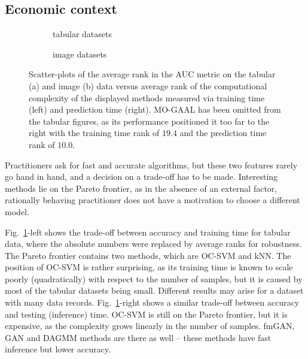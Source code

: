 \subsection{Economic context}
\label{sec:economic_context}
\begin{figure*}
    \centering
    \begin{subfigure}{\columnwidth}
        \centering
        \small
        \resizebox {0.66\linewidth}{!}{
            
        }
        \caption{tabular datasets}
        \label{fig:tabular_total_eval_t_fit_t_combined}
    \end{subfigure}
    \begin{subfigure}{\columnwidth}
        \centering
        \small
        \resizebox {0.66\linewidth}{!}{
            
        }
        \caption{image datasets}
        \label{fig:images_total_eval_t_fit_t_combined}
    \end{subfigure}
    \caption{Scatter-plots of the average rank in the AUC metric on the tabular  (a) and image (b) data versus average rank of the computational complexity of the displayed methods measured via training time (left) and prediction time (right). MO-GAAL has been omitted from the tabular figures, as its performance positioned it too far to the right with the training time rank of $19.4$ and the prediction time rank of $10.0$.}
    \label{fig:images_total_eval_t_fit_t_combined_joined}
\end{figure*}

Practitioners ask for fast and accurate algorithms, but these two features rarely go hand in hand, and a decision on a trade-off has to be made. Interesting methods lie on the Pareto frontier, as in the absence of an external factor, rationally behaving practitioner does not have a motivation to choose a different model.

Fig.~\ref{fig:tabular_total_eval_t_fit_t_combined}-left shows the trade-off between accuracy and training time for tabular data, where the absolute numbers were replaced by average ranks for robustness. The Pareto frontier contains two methods, which are OC-SVM and kNN. The position of OC-SVM is rather surprising, as its training time is known to scale poorly (quadratically) with respect to the number of samples, but it is caused by most of the tabular datasets being small. Different results may arise for a dataset with many data records. Fig.~\ref{fig:tabular_total_eval_t_fit_t_combined}-right shows a similar trade-off between accuracy and testing (inference) time. OC-SVM is still on the Pareto frontier, but it is expensive, as the complexity grows linearly in the number of samples. fmGAN, GAN and DAGMM methods are there as well -- these methods have fast inference but lower accuracy.

